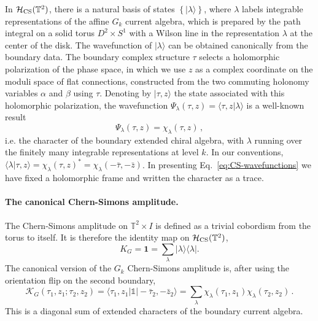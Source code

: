 \documentclass[11pt]{article}
\numberwithin{equation}{section}
\begin{document}
In $\mathcal H_{\rm CS}(\mathbb{T}^2)$, there is a natural basis of states $\left\{|\lambda \rangle \right\}$, where $\lambda$ labels integrable representations of the affine $G_k$ current algebra, which is prepared by the path integral on a solid torus $D^2\times S^1$ with a Wilson line in the representation $\lambda$ at the center of the disk. The wavefunction of  $|\lambda\rangle$ can be obtained canonically from the boundary data. The boundary complex structure $\tau$ selects a holomorphic polarization of the phase space, in which we use $z$ as  a complex coordinate on the moduli space of flat connections, constructed from the two commuting holonomy variables $\alpha$ and $\beta$ using $\tau$. Denoting by   $|\tau,z\rangle$ the state associated with this holomorphic polarization, the wavefunction $\Psi_\lambda(\tau,z)= \langle \tau,z|\lambda\rangle$ is a well-known result
\cite{Witten:1988hf, Elitzur:1989nr}
\begin{equation}
    \Psi_\lambda(\tau,z)= \chi_{\lambda}(\tau,z)\,,
    \label{eq:CS-wavefunctions}
\end{equation}
i.e. the character of the boundary extended chiral algebra, with $\lambda$ running over the finitely many integrable representations at level $k$. In our conventions, $\langle \lambda|\tau,z\rangle = \chi_{\lambda}(\tau,z)^* = \chi_{\lambda}(-\bar{\tau},-\bar{z})$. In presenting Eq.~\eqref{eq:CS-wavefunctions} we have fixed a holomorphic frame and written the character as a trace. 

\paragraph{The canonical Chern-Simons amplitude.}
The Chern-Simons amplitude on $\mathbb{T}^2\times I$ is defined as a trivial cobordism from the torus to itself. It is therefore the identity map on $\mathcal H_{\rm CS}(\mathbb{T}^2)$,
\begin{equation}
    K_{G}
    =\mathbf 1
    =\sum_{\lambda}|\lambda\rangle\langle \lambda|.
    \label{eq:CS-identity-kernel}
\end{equation}
The canonical version of the $G_k$ Chern-Simons amplitude is, after using the orientation flip on the second boundary,
\begin{equation}
    \mathcal{K}_G(\tau_1,z_1;\tau_2,z_2) =\langle \tau_1,z_1|\mathbb{1}|-\bar{\tau}_2,-\bar{z}_2\rangle =  \sum_{\lambda} \chi_{\lambda}(\tau_1,z_1)\chi_{\lambda}(\tau_2,z_2)\,.
    \label{eq:CS-kernel-general}
\end{equation}
This is a diagonal sum of extended characters of the boundary current algebra. 
\end{document}
